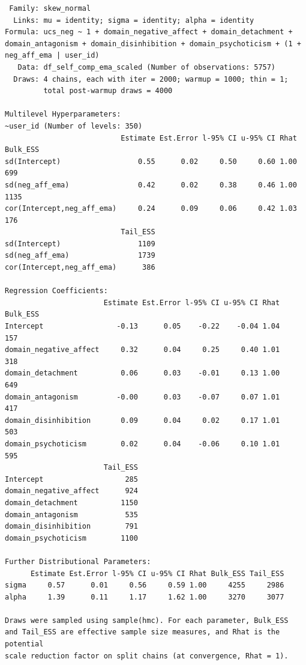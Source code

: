 \documentclass[
  11pt,
  a4paper,
  onecolumn]{article}
\begin{document}
\begin{verbatim}
 Family: skew_normal 
  Links: mu = identity; sigma = identity; alpha = identity 
Formula: ucs_neg ~ 1 + domain_negative_affect + domain_detachment + domain_antagonism + domain_disinhibition + domain_psychoticism + (1 + neg_aff_ema | user_id) 
   Data: df_self_comp_ema_scaled (Number of observations: 5757) 
  Draws: 4 chains, each with iter = 2000; warmup = 1000; thin = 1;
         total post-warmup draws = 4000

Multilevel Hyperparameters:
~user_id (Number of levels: 350) 
                           Estimate Est.Error l-95% CI u-95% CI Rhat Bulk_ESS
sd(Intercept)                  0.55      0.02     0.50     0.60 1.00      699
sd(neg_aff_ema)                0.42      0.02     0.38     0.46 1.00     1135
cor(Intercept,neg_aff_ema)     0.24      0.09     0.06     0.42 1.03      176
                           Tail_ESS
sd(Intercept)                  1109
sd(neg_aff_ema)                1739
cor(Intercept,neg_aff_ema)      386

Regression Coefficients:
                       Estimate Est.Error l-95% CI u-95% CI Rhat Bulk_ESS
Intercept                 -0.13      0.05    -0.22    -0.04 1.04      157
domain_negative_affect     0.32      0.04     0.25     0.40 1.01      318
domain_detachment          0.06      0.03    -0.01     0.13 1.00      649
domain_antagonism         -0.00      0.03    -0.07     0.07 1.01      417
domain_disinhibition       0.09      0.04     0.02     0.17 1.01      503
domain_psychoticism        0.02      0.04    -0.06     0.10 1.01      595
                       Tail_ESS
Intercept                   285
domain_negative_affect      924
domain_detachment          1150
domain_antagonism           535
domain_disinhibition        791
domain_psychoticism        1100

Further Distributional Parameters:
      Estimate Est.Error l-95% CI u-95% CI Rhat Bulk_ESS Tail_ESS
sigma     0.57      0.01     0.56     0.59 1.00     4255     2986
alpha     1.39      0.11     1.17     1.62 1.00     3270     3077

Draws were sampled using sample(hmc). For each parameter, Bulk_ESS
and Tail_ESS are effective sample size measures, and Rhat is the potential
scale reduction factor on split chains (at convergence, Rhat = 1).
\end{verbatim}
\end{document}

